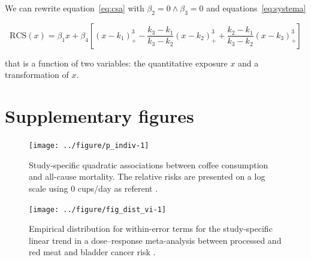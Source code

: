 \documentclass[11pt,a4paper,twoside,openany]{book}\usepackage{knitr}
\begin{document}
{\noindent We can rewrite equation~\ref{eq:csa} with $\beta_2 = 0 \land \beta_3 = 0$ and equations~\ref{eq:systema}

\begin{equation}
\mathrm{RCS}(x) = \beta_1 x + \beta_4 \left[ \left( x - k_1 \right)_{+}^3 - \frac{k_3 - k_1}{k_3 - k_2} \left( x - k_2  \right)_{+}^3 + \frac{k_2 - k_1}{k_3 - k_2} \left(x - k_3 \right)_{+}^3\right]
\label{eq:rcsfina}
\end{equation}

\noindent that is a function of two variables: the quantitative exposure $x$ and a transformation of $x$.


\chapter{Supplementary figures}

\begin{knitrout}\footnotesize
{}\color{fgcolor}\begin{figure}[ht!]

{\centering \texttt{[image: ../figure/p\_indiv-1]} 

}

\caption[Study-specific quadratic associations between coffee consumption and all-cause mortality]{Study-specific quadratic associations between coffee consumption and all-cause mortality. The relative risks are presented on a log scale using 0 cups/day as referent \citep{crippa2016red}.}\label{fig:p_indiv}
\end{figure}


\end{knitrout}

\begin{knitrout}\footnotesize
{}\color{fgcolor}\begin{figure}[ht!]

{\centering \texttt{[image: ../figure/fig\_dist\_vi-1]} 

}

\caption[Empirical distribution for within-error terms for the study-specific linear trend in a dose--response meta-analysis between processed and red meat and bladder cancer risk \citep{crippa2016red}]{Empirical distribution for within-error terms for the study-specific linear trend in a dose--response meta-analysis between processed and red meat and bladder cancer risk \citep{crippa2016red}.}\label{fig:fig_dist_vi}
\end{figure}



\end{knitrout}}
\end{document}
